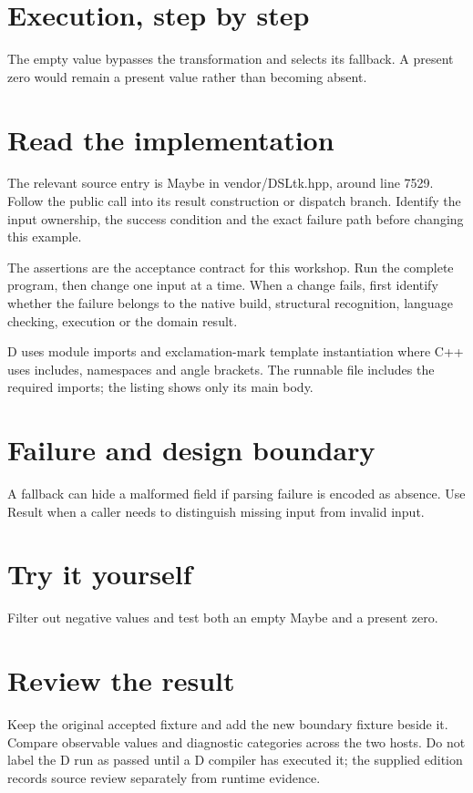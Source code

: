 
\section*{Execution, step by step}
The empty value bypasses the transformation and selects its fallback. A present zero would remain a present value rather than becoming absent.

\section*{Read the implementation}
The relevant source entry is Maybe in vendor/DSLtk.hpp, around line 7529. Follow the public call into its result construction or dispatch branch. Identify the input ownership, the success condition and the exact failure path before changing this example.

The assertions are the acceptance contract for this workshop. Run the complete program, then change one input at a time. When a change fails, first identify whether the failure belongs to the native build, structural recognition, language checking, execution or the domain result.

\clearpage
{}
D uses module imports and exclamation-mark template instantiation where C++ uses includes, namespaces and angle brackets. The runnable file includes the required imports; the listing shows only its main body.


\section*{Failure and design boundary}
A fallback can hide a malformed field if parsing failure is encoded as absence. Use Result when a caller needs to distinguish missing input from invalid input.

\section*{Try it yourself}
Filter out negative values and test both an empty Maybe and a present zero.

\section*{Review the result}
Keep the original accepted fixture and add the new boundary fixture beside it. Compare observable values and diagnostic categories across the two hosts. Do not label the D run as passed until a D compiler has executed it; the supplied edition records source review separately from runtime evidence.

